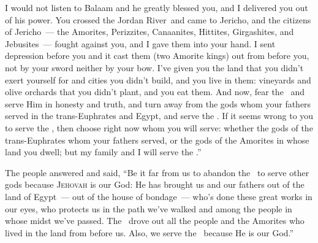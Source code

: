 \begin{inparaenum}
   I would not listen to Balaam and he greatly blessed you, and I delivered you out of his power.%
   You crossed the Jordan River\understood\ and came to Jericho, and the citizens of Jericho~--- the Amorites, Perizzites, Canaanites, Hittites, Girgashites, and Jebusites~--- fought against you, and I gave them into your hand.%
   I sent depression before you and it cast them (two Amorite kings) out from before you, not by your sword neither by your bow.%
   I've given you the land that you didn't exert yourself for and cities you didn't build, and you live in them: vineyards and olive orchards that you didn't plant, and you eat them.\understood%
   And now, fear the \lord\ and serve Him in honesty and truth, and turn away from the gods whom your fathers served in the trans-Euphrates and Egypt, and serve the \lord.%
   If it seems wrong to you to serve the \lord, then choose right now whom you will serve: whether the gods of the trans-Euphrates whom your fathers served, or the gods of the Amorites in whose land you dwell; but my family and I will serve the \lord.''%
  
   The people answered and said, ``Be it far from us to abandon the \lord\ to serve other gods%
   because \textsc{Jehovah} is our God: He has brought us and our fathers out of the land of Egypt~--- out of the house of bondage~--- who's done these great works in our eyes, who protects us in the path we've walked and among the people in whose midst we've passed.%
   The \lord\ drove out all the people and the Amorites who lived in the land from before us. Also, we serve the \lord\ because He is our God.''%
  

\end{inparaenum}
